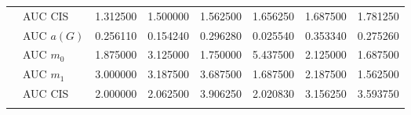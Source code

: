 \begin{table}[htbp]
\begin{tabular}{llrrrrrr}
    & AUC CIS & 1.312500 & 1.500000 & 1.562500 & 1.656250 & 1.687500 & 1.781250 \\
    \addlinespace
    \multirow{4}{*}{random} & AUC $a(G)$ & 0.256110 & 0.154240 & 0.296280 & 0.025540 & 0.353340 & 0.275260 \\
    & AUC $m_0$ & 1.875000 & 3.125000 & 1.750000 & 5.437500 & 2.125000 & 1.687500 \\
    & AUC $m_1$ & 3.000000 & 3.187500 & 3.687500 & 1.687500 & 2.187500 & 1.562500 \\
    & AUC CIS & 2.000000 & 2.062500 & 3.906250 & 2.020830 & 3.156250 & 3.593750 \\
    \addlinespace
    \bottomrule
  \end{tabular}
\end{table}

